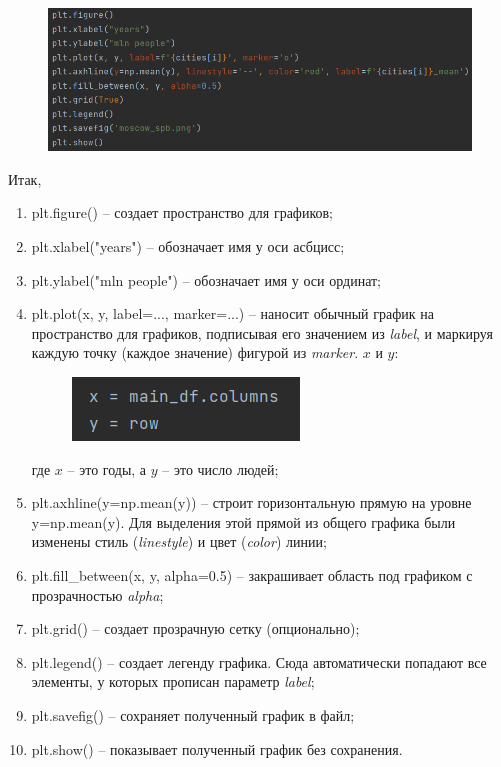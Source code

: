\begin{figure}[H]
	\begin{center}
		\includegraphics{include/fig/plotting}
	\end{center}
\end{figure}

Итак, 

\begin{enumerate}
	\item plt.figure() -- создает пространство для графиков;
	\item plt.xlabel("years") -- обозначает имя у оси асбцисс;
	\item plt.ylabel("mln people") -- обозначает имя у оси ординат;
	\item plt.plot(x, y, label=..., marker=...) -- наносит обычный график на пространство для графиков, подписывая его значением из \textit{label}, и маркируя каждую точку (каждое значение) фигурой из \textit{marker}. $x$ и $y$:
	
	\begin{figure}[H]
		\begin{center}
			\includegraphics{include/fig/xy}
		\end{center}
	\end{figure}
	
	где $x$ -- это годы, а $y$ -- это число людей;
	
	\item plt.axhline(y=np.mean(y)) -- строит горизонтальную прямую на уровне y=np.mean(y). Для выделения этой прямой из общего графика были изменены стиль (\textit{linestyle}) и цвет (\textit{color}) линии;
	\item plt.fill\_between(x, y, alpha=0.5) -- закрашивает область под графиком с прозрачностью \textit{alpha};
	\item plt.grid() -- создает прозрачную сетку (опционально);
	\item plt.legend() -- создает легенду графика. Сюда автоматически попадают все элементы, у которых прописан параметр \textit{label};
	\item plt.savefig() -- сохраняет полученный график в файл;
	\item plt.show() -- показывает полученный график без сохранения.
\end{enumerate}

